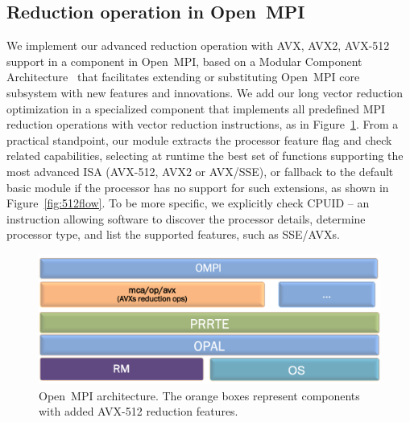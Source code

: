 \documentclass[5p,times,twocolumn]{elsarticle}
\newcommand{\ompi}[0]{Open~MPI\xspace}
\begin{document}
\subsection{Reduction operation in \ompi}
We implement our advanced reduction operation with AVX, AVX2, AVX-512
support in a component in \ompi, based on a Modular Component
Architecture~\cite{gabriel04ompi, dongprrte} that facilitates extending or
substituting \ompi core subsystem with new features and innovations.
We add our long vector reduction optimization in a specialized component that
implements all predefined MPI reduction operations with vector
reduction instructions, as in Figure~\ref{fig:avxmca}. From a
practical standpoint, our module extracts the processor
feature flag and check related capabilities, selecting at runtime the best set of
functions supporting the most advanced ISA (AVX-512, AVX2 or AVX/SSE),
or fallback to the default basic module if the processor has no
support for such extensions, as shown in Figure~\ref{fig:512flow}.
%
To be more specific, we explicitly check CPUID -- an instruction allowing software to discover the
processor details, determine processor type, and list the supported features, such as
SSE/AVXs.

\begin{figure}[h]
    \centering
    \includegraphics[width=\linewidth]{mca1.png}
    \caption{\ompi architecture. The orange boxes represent components with added AVX-512 reduction features.}
    \label{fig:avxmca}
\end{figure}
\end{document}

